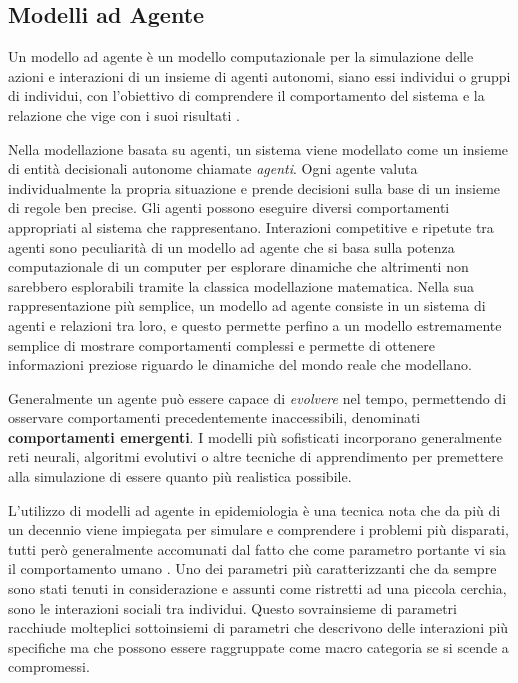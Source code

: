\subsection{Modelli ad Agente}
Un modello ad agente è un modello computazionale per la simulazione delle 
azioni e interazioni di un insieme di agenti autonomi, siano essi individui
o gruppi di individui, con l'obiettivo di comprendere il comportamento 
del sistema e la relazione che vige con i suoi risultati \cite{wiki:Agent-based_model}
\cite{7822080}.

Nella modellazione basata su agenti, un sistema viene modellato come un insieme 
di entità decisionali autonome chiamate \emph{agenti}. Ogni agente valuta 
individualmente la propria situazione e prende decisioni sulla base di un insieme di 
regole ben precise. Gli agenti possono eseguire diversi comportamenti appropriati
al sistema che rappresentano. Interazioni competitive e ripetute tra agenti sono 
peculiarità di un modello ad agente che si basa sulla potenza computazionale di un 
computer per esplorare dinamiche che altrimenti non sarebbero esplorabili tramite la 
classica modellazione matematica. Nella sua rappresentazione più semplice, un modello 
ad agente consiste in un sistema di agenti e relazioni tra loro, e questo permette 
perfino a un modello estremamente semplice di mostrare comportamenti complessi e 
permette di ottenere informazioni preziose riguardo le dinamiche del mondo reale che
modellano. 

Generalmente un agente può essere capace di \emph{evolvere} nel tempo, permettendo 
di osservare comportamenti precedentemente inaccessibili, denominati \textbf{comportamenti emergenti}.
I modelli più sofisticati incorporano generalmente reti neurali, algoritmi evolutivi o 
altre tecniche di apprendimento per premettere alla simulazione di essere quanto più 
realistica possibile.

L'utilizzo di modelli ad agente in epidemiologia è una tecnica nota che 
da più di un decennio viene impiegata per simulare e comprendere 
i problemi più disparati, tutti però generalmente accomunati
dal fatto che come parametro portante vi sia il comportamento umano \cite{Groff2019}
\cite{El-Sayed2012-ac} \cite{Tracy2018-lc} \cite{Bissett2021}. 
Uno dei parametri più caratterizzanti che da sempre sono stati tenuti 
in considerazione e assunti come ristretti ad una piccola cerchia, sono 
le interazioni sociali tra individui. Questo sovrainsieme di parametri 
racchiude molteplici sottoinsiemi di parametri che descrivono delle 
interazioni più specifiche ma che possono essere raggruppate come macro 
categoria se si scende a compromessi. 

